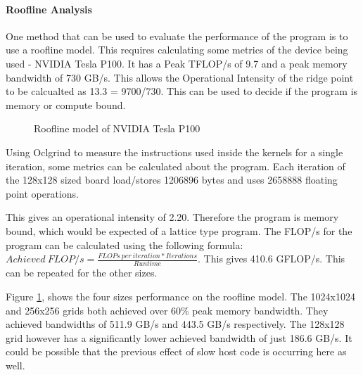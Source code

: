 


\paragraph{Roofline Analysis}
One method that can be used to evaluate the performance of the program is to use a roofline model. This requires calculating some metrics of the device being used - NVIDIA Tesla P100. It has a Peak TFLOP/s of 9.7 and a peak memory bandwidth of 730 GB/s. This allows the Operational Intensity of the ridge point to be calcualted as 13.3 = 9700/730. This can be used to decide if the program is memory or compute bound.

\begin{figure}[ht]

\vspace{-3mm}
\caption{Roofline model of NVIDIA Tesla P100}
\label{graph:roofline}
\vspace{-4mm}
\end{figure}

Using Oclgrind to measure the instructions used inside the kernels for a single iteration, some metrics can be calculated about the program. Each iteration of the 128x128 sized board load/stores 1206896 bytes and uses 2658888 floating point operations. 


This gives an operational intensity of 2.20. Therefore the program is memory bound, which would be expected of a lattice type program. The FLOP/s for the program can be calculated using the following formula: $Achieved\ FLOP/s = \frac{FLOPs\ per\ iteration * Iterations}{Runtime}$. This gives 410.6 GFLOP/s. This can be repeated for the other sizes.




Figure \ref{graph:roofline}, shows the four sizes performance on the roofline model. The 1024x1024 and 256x256 grids both achieved over 60\% peak memory bandwidth. They achieved bandwidths of 511.9 GB/s and 443.5 GB/s respectively. The 128x128 grid however has a significantly lower achieved bandwidth of just 186.6 GB/s. It could be possible that the previous effect of slow host code is occurring here as well. 
